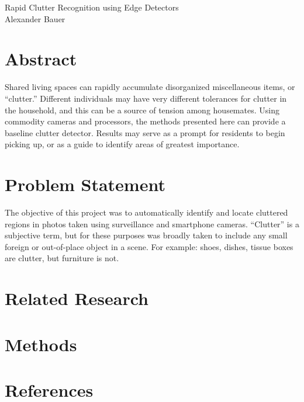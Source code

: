 \documentclass[11pt]{article}
\begin{document}
\begin{center}
    {\LARGE Rapid Clutter Recognition using Edge Detectors} \\
    {\large Alexander Bauer}
\end{center}

\section*{Abstract}

Shared living spaces can rapidly accumulate disorganized miscellaneous items, or
``clutter.'' Different individuals may have very different tolerances for
clutter in the household, and this can be a source of tension among housemates.
Using commodity cameras and processors, the methods presented here can provide a
baseline clutter detector. Results may serve as a prompt for residents to begin
picking up, or as a guide to identify areas of greatest importance.

\section*{Problem Statement}

The objective of this project was to automatically identify and locate cluttered
regions in photos taken using surveillance and smartphone cameras.  ``Clutter''
is a subjective term, but for these purposes was broadly taken to include any
small foreign or out-of-place object in a scene. For example: shoes, dishes,
tissue boxes are clutter, but furniture is not.

\section*{Related Research}

\section*{Methods}



\pagebreak
\section*{References}

\printbibliography
\end{document}
